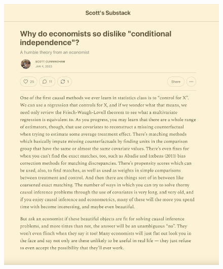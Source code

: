 \documentclass{beamer}
\begin{document}
\begin{frame}{}

  \begin{figure}
    \includegraphics[scale=0.25]{./lecture_includes/disliking_controls}
  \end{figure}

\end{frame}
\end{document}
